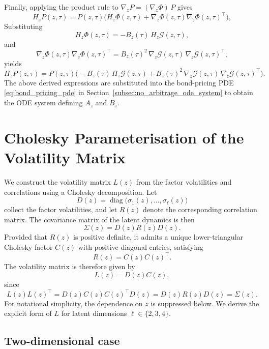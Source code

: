 Finally, applying the product rule to $\nabla_z P = (\nabla_z \Phi)\,P$ gives
\[
H_z P (z, \tau) = P(z, \tau) \big(H_z\Phi (z, \tau) + \nabla_z\Phi(z, \tau)\nabla_z\Phi(z, \tau)^\top\big),
\]
Substituting
\[
H_z\Phi(z, \tau) = -B_z(\tau)\,H_z \mathcal{G}(z,\tau),
\]
and
\[
\nabla_z\Phi(z, \tau) \nabla_z\Phi(z, \tau)^\top
=
B_z(\tau)^2\,\nabla_z \mathcal{G}(z,\tau)\,\nabla_z \mathcal{G}(z,\tau)^\top,
\]
yields
\[
H_z P(z, \tau)
=
P(z, \tau) \Big(
-B_z(\tau) \,H_z \mathcal{G}(z, \tau)
+
B_z(\tau)^2\,\nabla_z \mathcal{G}(z, \tau)\,\nabla_z \mathcal{G}(z, \tau)^\top
\Big).
\] 
The above derived expressions are substituted into the bond-pricing PDE
\eqref{eq:bond_pricing_pde} in Section~\ref{subsec:no_arbitrage_ode_system} to obtain the ODE system defining \(A_z\) and \(B_z\).


\section{Cholesky Parameterisation of the Volatility Matrix}
\label{sec:cholesky_volatility}

We construct the volatility matrix \(L(z)\) from the factor volatilities and correlations using a Cholesky decomposition. Let
\[
D(z)=\operatorname{diag}\bigl(\sigma_1(z),\dots,\sigma_\ell(z)\bigr)
\]
collect the factor volatilities, and let \(R(z)\) denote the corresponding correlation matrix. The covariance matrix of the latent dynamics is then
\[
\Sigma(z)=D(z)R(z)D(z).
\]
Provided that \(R(z)\) is positive definite, it admits a unique lower-triangular Cholesky factor \(C(z)\) with positive diagonal entries, satisfying
\[
R(z)=C(z)C(z)^\top.
\]
The volatility matrix is therefore given by
\[
L(z)=D(z)C(z),
\]
since
\[
L(z)L(z)^\top
=
D(z)C(z)C(z)^\top D(z)
=
D(z)R(z)D(z)
=
\Sigma(z).
\]
For notational simplicity, the dependence on \(z\) is suppressed below. We derive the explicit form of \(L\) for latent dimensions \(\ell\in\{2,3,4\}\).

\subsection{Two-dimensional case}

